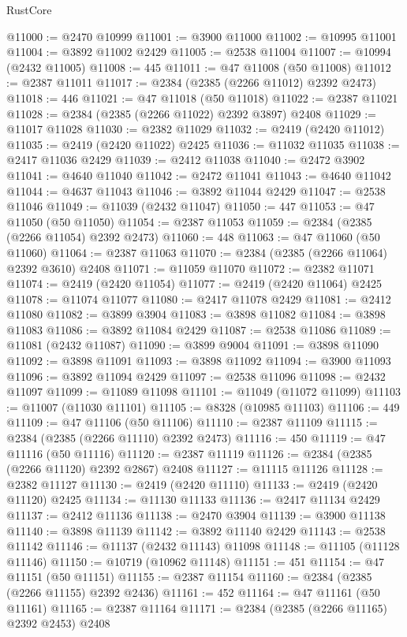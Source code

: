 \begin{lexlean}{RustCore}
\begin{coremodule}
@11000 := @2470 @10999
@11001 := @3900 @11000
@11002 := @10995 @11001
@11004 := @3892 @11002 @2429
@11005 := @2538 @11004
@11007 := @10994 (@2432 @11005)
@11008 := 445
@11011 := @47 @11008 (@50 @11008)
@11012 := @2387 @11011
@11017 := @2384 (@2385 (@2266 @11012) @2392 @2473)
@11018 := 446
@11021 := @47 @11018 (@50 @11018)
@11022 := @2387 @11021
@11028 := @2384 (@2385 (@2266 @11022) @2392 @3897) @2408
@11029 := @11017 @11028
@11030 := @2382 @11029
@11032 := @2419 (@2420 @11012)
@11035 := @2419 (@2420 @11022) @2425
@11036 := @11032 @11035
@11038 := @2417 @11036 @2429
@11039 := @2412 @11038
@11040 := @2472 @3902
@11041 := @4640 @11040
@11042 := @2472 @11041
@11043 := @4640 @11042
@11044 := @4637 @11043
@11046 := @3892 @11044 @2429
@11047 := @2538 @11046
@11049 := @11039 (@2432 @11047)
@11050 := 447
@11053 := @47 @11050 (@50 @11050)
@11054 := @2387 @11053
@11059 := @2384 (@2385 (@2266 @11054) @2392 @2473)
@11060 := 448
@11063 := @47 @11060 (@50 @11060)
@11064 := @2387 @11063
@11070 := @2384 (@2385 (@2266 @11064) @2392 @3610) @2408
@11071 := @11059 @11070
@11072 := @2382 @11071
@11074 := @2419 (@2420 @11054)
@11077 := @2419 (@2420 @11064) @2425
@11078 := @11074 @11077
@11080 := @2417 @11078 @2429
@11081 := @2412 @11080
@11082 := @3899 @3904
@11083 := @3898 @11082
@11084 := @3898 @11083
@11086 := @3892 @11084 @2429
@11087 := @2538 @11086
@11089 := @11081 (@2432 @11087)
@11090 := @3899 @9004
@11091 := @3898 @11090
@11092 := @3898 @11091
@11093 := @3898 @11092
@11094 := @3900 @11093
@11096 := @3892 @11094 @2429
@11097 := @2538 @11096
@11098 := @2432 @11097
@11099 := @11089 @11098
@11101 := @11049 (@11072 @11099)
@11103 := @11007 (@11030 @11101)
@11105 := @8328 (@10985 @11103)
@11106 := 449
@11109 := @47 @11106 (@50 @11106)
@11110 := @2387 @11109
@11115 := @2384 (@2385 (@2266 @11110) @2392 @2473)
@11116 := 450
@11119 := @47 @11116 (@50 @11116)
@11120 := @2387 @11119
@11126 := @2384 (@2385 (@2266 @11120) @2392 @2867) @2408
@11127 := @11115 @11126
@11128 := @2382 @11127
@11130 := @2419 (@2420 @11110)
@11133 := @2419 (@2420 @11120) @2425
@11134 := @11130 @11133
@11136 := @2417 @11134 @2429
@11137 := @2412 @11136
@11138 := @2470 @3904
@11139 := @3900 @11138
@11140 := @3898 @11139
@11142 := @3892 @11140 @2429
@11143 := @2538 @11142
@11146 := @11137 (@2432 @11143) @11098
@11148 := @11105 (@11128 @11146)
@11150 := @10719 (@10962 @11148)
@11151 := 451
@11154 := @47 @11151 (@50 @11151)
@11155 := @2387 @11154
@11160 := @2384 (@2385 (@2266 @11155) @2392 @2436)
@11161 := 452
@11164 := @47 @11161 (@50 @11161)
@11165 := @2387 @11164
@11171 := @2384 (@2385 (@2266 @11165) @2392 @2453) @2408

\end{coremodule}
\end{lexlean}
